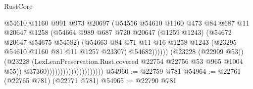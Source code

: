 \begin{lexlean}{RustCore}
\begin{coremodule}
                                                    @54610
                                                    @1160
                                                    @991
                                                    @973
                                                    @20697
                                                    (@54556
                                                      @54610
                                                      @1160
                                                      @473
                                                      @84
                                                      @687
                                                      @11
                                                      @20647
                                                      @1258
                                                      (@54664
                                                        @989
                                                        @687
                                                        @720
                                                        @20647
                                                        (@1259 @1243)
                                                        (@54672 @20647 @54675 @54582)
                                                        (@54663
                                                          @84
                                                          @71
                                                          @11
                                                          @16
                                                          @1258
                                                          @1243
                                                          (@23295 @54610 @1160 @81 @11 @1257 @23307)
                                                          @54682))))))
                                              (@23228 (@22909 @53))
                                              (@23228
                                                (LexLeanPreservation.Rust.covered
                                                  @22754
                                                  @22756
                                                  @53
                                                  @965
                                                  @1004
                                                  @55))
                                              @37360)))))))))))))))))))))
@54960 := @22759 @781
@54964 := @22761 (@22765 @781) (@22771 @781)
@54965 := @22790 @781

\end{coremodule}
\end{lexlean}
